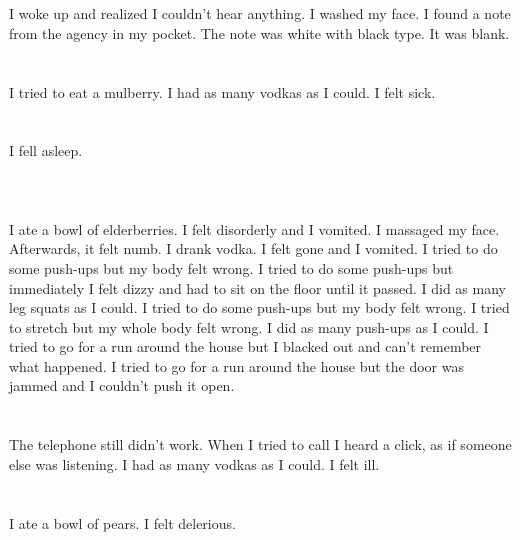 \documentclass{article}
\begin{document}
    \section{}
    I woke up and realized I couldn't hear anything. I washed my face. I found a note from the agency in my pocket. The note was white with black type. It was blank.  
    \newpage
    
    \section{}
    I tried to eat a mulberry. I had as many vodkas as I could. I felt sick.  
    \newpage
    
    \section{}
    I fell asleep.\\\\ 
    \newpage
    
    \section{}
    I ate a bowl of elderberries. I felt disorderly and I vomited. I massaged my face. Afterwards, it felt numb. I drank vodka. I felt gone and I vomited.  I tried to do some push-ups but my body felt wrong.  I tried to do some push-ups but immediately I felt dizzy and had to sit on the floor until it passed.  I did as many leg squats as I could.  I tried to do some push-ups but my body felt wrong.   I tried to stretch but my whole body felt wrong.  I did as many push-ups as I could.  I tried to go for a run around the house but I blacked out and can't remember what happened.  I tried to go for a run around the house but the door was jammed and I couldn't push it open.  
    \newpage
    
    \section{}
    The telephone still didn't work. When I tried to call I heard a click, as if someone else was listening. I had as many vodkas as I could. I felt ill.  
    \newpage
    
    \section{}
    I ate a bowl of pears. I felt delerious.  
    \newpage
    
\end{document}

